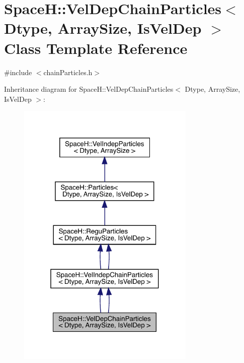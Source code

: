 \hypertarget{class_space_h_1_1_vel_dep_chain_particles}{}\section{SpaceH\+:\+:Vel\+Dep\+Chain\+Particles$<$ Dtype, Array\+Size, Is\+Vel\+Dep $>$ Class Template Reference}
\label{class_space_h_1_1_vel_dep_chain_particles}


{\ttfamily \#include $<$chain\+Particles.\+h$>$}



Inheritance diagram for SpaceH\+:\+:Vel\+Dep\+Chain\+Particles$<$ Dtype, Array\+Size, Is\+Vel\+Dep $>$\+:
\nopagebreak
\begin{figure}[H]
\begin{center}
\leavevmode
\includegraphics[width=241pt]{class_space_h_1_1_vel_dep_chain_particles__inherit__graph}
\end{center}
\end{figure}


